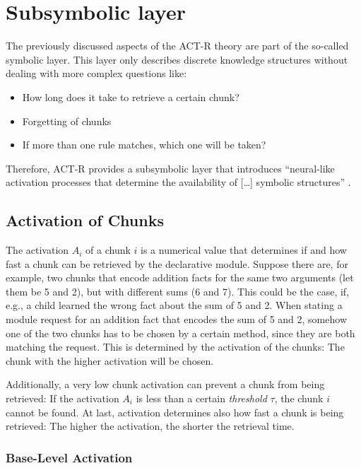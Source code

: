 \enlargethispage{\baselineskip}

\section{Subsymbolic layer}
\label{subsymbolic_layer}

The previously discussed aspects of the ACT-R theory are part of the so-called symbolic layer. This layer only describes discrete knowledge structures without dealing with more complex questions like: 

\begin{itemize}
\item How long does it take to retrieve a certain chunk? 
\item Forgetting of chunks
\item If more than one rule matches, which one will be taken?
\end{itemize}

Therefore, ACT-R provides a subsymbolic layer that introduces ``neural-like activation processes that determine the availability of [\dots] symbolic structures'' \cite{anderson_implications_2000}.

\subsection{Activation of Chunks}
\label{activation}

The activation $A_i$ of a chunk $i$ is a numerical value that determines if and how fast a chunk can be retrieved by the declarative module. Suppose there are, for example, two chunks that encode addition facts for the same two arguments (let them be 5 and 2), but with different sums (6 and 7). This could be the case, if, e.g., a child learned the wrong fact about the sum of 5 and 2. When stating a module request for an addition fact that encodes the sum of 5 and 2, somehow one of the two chunks has to be chosen by a certain method, since they are both matching the request. This is determined by the activation of the chunks: The chunk with the higher activation will be chosen.

Additionally, a very low chunk activation can prevent a chunk from being retrieved: If the activation $A_i$ is less than a certain \emph{threshold} $\tau$, the chunk $i$ cannot be found. At last, activation determines also how fast a chunk is being retrieved: The higher the activation, the shorter the retrieval time.

\subsubsection{Base-Level Activation}
\label{base_level_activation}

